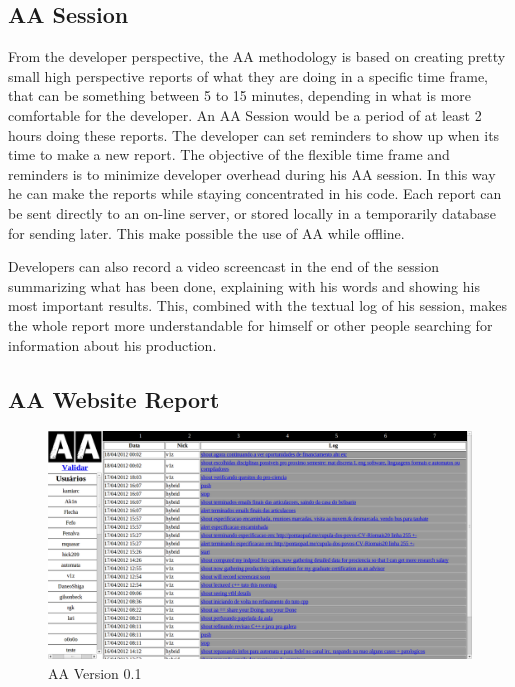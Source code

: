 \documentclass[letterpaper]{article}
\begin{document}
\subsection{AA Session}

From the developer perspective, the AA methodology is based on creating pretty
small high perspective reports of what they are doing in a specific time frame,
that can be something between 5 to 15 minutes, depending in what is more
comfortable for the developer. An AA Session would be a period of at least 2
hours doing these reports. The developer can set reminders to show up when its
time to make a new report. The objective of the flexible time frame and
reminders is to minimize developer overhead during his AA session. In this way
he can make the reports while staying concentrated in his code. Each report can
be sent directly to an on-line server, or stored locally in a temporarily
database for sending later. This make possible the use of AA while offline.

Developers can also record a video screencast in the end of the session
summarizing what has been done, explaining with his words and showing his most
important results. This, combined with the textual log of his session, makes the
whole report more understandable for himself or other people searching for
information about his production.

\subsection{AA Website Report}

\begin{figure}
\begin{center}
   \includegraphics[width=0.95\linewidth]{figs/aa-0_1.png}
\end{center}
   \caption{AA Version 0.1}
\label{fig:aaserver}
\end{figure}
\end{document}
